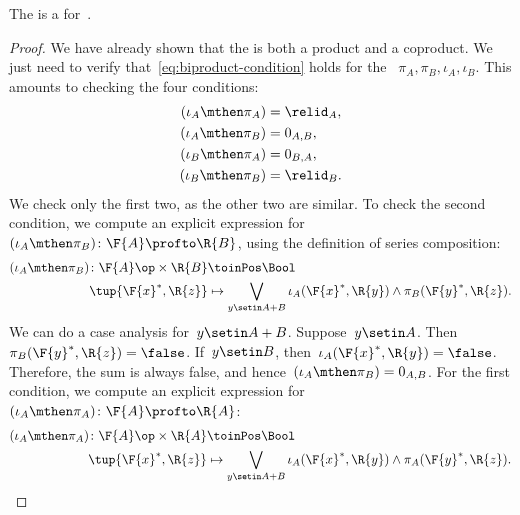 \begin{lemma}
    The  is a  for~\DP.
\end{lemma}
\begin{proof}
    We have already shown that the  is both a product and a coproduct.
    We just need to verify that~\cref{eq:biproduct-condition} holds for the ~$\pi_A, \pi_B, \iota_A, \iota_B$.
    This amounts to checking the four conditions:
    \begin{equation}
        \begin{aligned}
            (\iota_A\mthen \pi_A)
                                  & = \relid_{A}, \\
            (\iota_A\mthen \pi_B) & = 0_{A,B}, \\
            (\iota_B\mthen \pi_A) & = 0_{B,A}, \\
            (\iota_B\mthen \pi_B) & = \relid_{B}.
        \end{aligned}
    \end{equation}
    We check only the first two, as the other two are similar.
    To check the second condition, we compute an explicit expression for~$(\iota_A\mthen \pi_B)\colon \F{A} \profto \R{B}$, using the definition of  series composition:
    \begin{equation}
        \begin{aligned}
            (\iota_A\mthen \pi_B)
            \colon \F{A}\op\times \R{B} & \toinPos \Bool \\
            \tup{\F{x}^*, \R{z}}        & \mapsto
            \bigvee_{y \setin A + B} \iota_A(\F{x}^*,\R{y}) \wedge \pi_B(\F{y}^*,\R{z}).
        \end{aligned}
    \end{equation}
    We can do a case analysis for~$y\setin A+B$.
    Suppose~$y\setin A$.
    Then~$\pi_B(\F{y}^*,\R{z}) = \false$.
    If~$y \setin B$, then~$\iota_A(\F{x}^*,\R{y}) = \false$.
    Therefore, the sum is always false, and hence~$(\iota_A\mthen \pi_B) = 0_{A,B}$.
    For the first condition, we compute an explicit expression for~$(\iota_A\mthen \pi_A) \colon \F{A} \profto \R{A}$:
    \begin{equation}
        \begin{aligned}
            (\iota_A\mthen \pi_A)
            \colon \F{A}\op\times \R{A} & \toinPos \Bool \\
            \tup{\F{x}^*, \R{z}}        & \mapsto
            \bigvee_{y \setin A + B} \iota_A(\F{x}^*,\R{y}) \wedge \pi_A(\F{y}^*,\R{z}).

\end{aligned}
\end{equation}
\end{proof}
